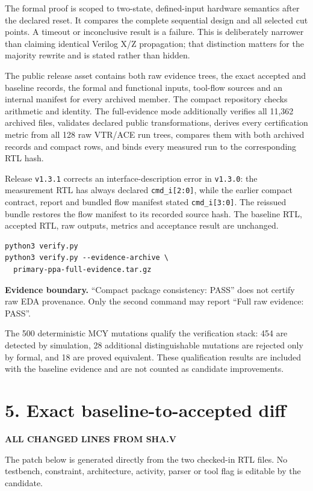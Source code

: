 \documentclass[10pt,a4paper]{article}
\newcommand{\smallcaps}[1]{\textcolor{Mid}{\fontsize{8.5}{10}\selectfont\bfseries\MakeUppercase{#1}}}
\newcommand{\newpageheading}[2]{\clearpage\section{#1}\smallcaps{#2}\vspace{6pt}}
\begin{document}
The formal proof is scoped to two-state, defined-input hardware semantics after the declared reset. It compares the complete sequential design and all selected cut points. A timeout or inconclusive result is a failure. This is deliberately narrower than claiming identical Verilog X/Z propagation; that distinction matters for the majority rewrite and is stated rather than hidden.

The public release asset contains both raw evidence trees, the exact accepted and baseline records, the formal and functional inputs, tool-flow sources and an internal manifest for every archived member. The compact repository checks arithmetic and identity. The full-evidence mode additionally verifies all 11,362 archived files, validates declared public transformations, derives every certification metric from all 128 raw VTR/ACE run trees, compares them with both archived records and compact rows, and binds every measured run to the corresponding RTL hash.

Release \texttt{v1.3.1} corrects an interface-description error in \texttt{v1.3.0}: the measurement RTL has always declared \texttt{cmd\_i[2:0]}, while the earlier compact contract, report and bundled flow manifest stated \texttt{cmd\_i[3:0]}. The reissued bundle restores the flow manifest to its recorded source hash. The baseline RTL, accepted RTL, raw outputs, metrics and acceptance result are unchanged.

\begin{lstlisting}
python3 verify.py
python3 verify.py --evidence-archive \
  primary-ppa-full-evidence.tar.gz
\end{lstlisting}

\begin{claimbox}
\textbf{Evidence boundary.} ``Compact package consistency: PASS'' does not certify raw EDA provenance. Only the second command may report ``Full raw evidence: PASS''.
\end{claimbox}

The 500 deterministic MCY mutations qualify the verification stack: 454 are detected by simulation, 28 additional distinguishable mutations are rejected only by formal, and 18 are proved equivalent. These qualification results are included with the baseline evidence and are not counted as candidate improvements.

\newpageheading{5. Exact baseline-to-accepted diff}{All changed lines from sha.v}

The patch below is generated directly from the two checked-in RTL files. No testbench, constraint, architecture, activity, parser or tool flag is editable by the candidate.
\end{document}
